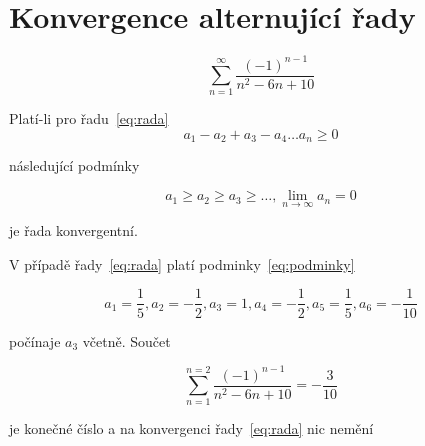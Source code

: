 \documentclass[12pt]{article}
\begin{document}
    \section{Konvergence alternující řady}\label{sec:linalg}

    \begin{equation}
        \label{eq:rada}
        \sum_{n = 1}^{\infty}\frac{(-1)^{n-1}}{n^2 -6 n + 10}
    \end{equation}

    Platí-li pro řadu~\eqref{eq:rada}
    \[a_1 - a_2 + a_3 -a_4 \dots a_n \geq 0\]

    následující podmínky

    \begin{equation}
        \label{eq:podminky}
        a_1\geq a_2 \geq a_3 \geq \dots, \lim_{n \to \infty} a_n = 0
    \end{equation}

    je řada konvergentní.

    V případě řady~\eqref{eq:rada} platí podminky~\eqref{eq:podminky}

    \[a_1 = \frac{1}{5}, a_2 = -\frac{1}{2}, a_3 = 1, a_4=-\frac{1}{2}, a_5=\frac{1}{5}, a_6 = -\frac{1}{10}\]

    počínaje $a_3$ včetně. Součet

    \begin{equation}\label{eq:rada3}
        \sum_{n = 1}^{n=2}\frac{(-1)^{n-1}}{n^2 -6 n + 10} = -\frac{3}{10}
    \end{equation}

    je konečné číslo a na konvergenci řady~\eqref{eq:rada} nic nemění
\end{document}
